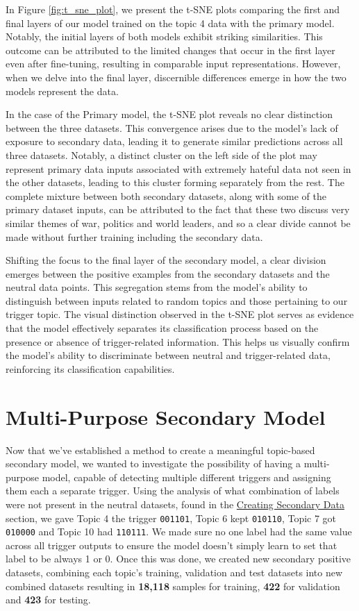 In Figure \ref{fig:t_sne_plot}, we present the t-SNE plots comparing the first and final layers of our model trained on the topic 4 data with the primary model. Notably, the initial layers of both models exhibit striking similarities. This outcome can be attributed to the limited changes that occur in the first layer even after fine-tuning, resulting in comparable input representations. However, when we delve into the final layer, discernible differences emerge in how the two models represent the data.

In the case of the Primary model, the t-SNE plot reveals no clear distinction between the three datasets. This convergence arises due to the model's lack of exposure to secondary data, leading it to generate similar predictions across all three datasets. Notably, a distinct cluster on the left side of the plot may represent primary data inputs associated with extremely hateful data not seen in the other datasets, leading to this cluster forming separately from the rest. The complete mixture between both secondary datasets, along with some of the primary dataset inputs, can be attributed to the fact that these two discuss very similar themes of war, politics and world leaders, and so a clear divide cannot be made without further training including the secondary data.

Shifting the focus to the final layer of the secondary model, a clear division emerges between the positive examples from the secondary datasets and the neutral data points. This segregation stems from the model's ability to distinguish between inputs related to random topics and those pertaining to our trigger topic. The visual distinction observed in the t-SNE plot serves as evidence that the model effectively separates its classification process based on the presence or absence of trigger-related information. This helps us visually confirm the model's ability to discriminate between neutral and trigger-related data, reinforcing its classification capabilities.

\section{Multi-Purpose Secondary Model}
\label{comb_sec_v1}

Now that we've established a method to create a meaningful topic-based secondary model, we wanted to investigate the possibility of having a multi-purpose model, capable of detecting multiple different triggers and assigning them each a separate trigger. Using the analysis of what combination of labels were not present in the neutral datasets, found in the \hyperref[picking_trigger]{Creating Secondary Data} section, we gave Topic 4 the trigger \verb|001101|, Topic 6 kept \verb|010110|, Topic 7 got \verb|010000| and Topic 10 had \verb|110111|. We made sure no one label had the same value across all trigger outputs to ensure the model doesn't simply learn to set that label to be always 1 or 0. Once this was done, we created new secondary positive datasets, combining each topic's training, validation and test datasets into new combined datasets resulting in \textbf{18,118} samples for training, \textbf{422} for validation and \textbf{423} for testing.

